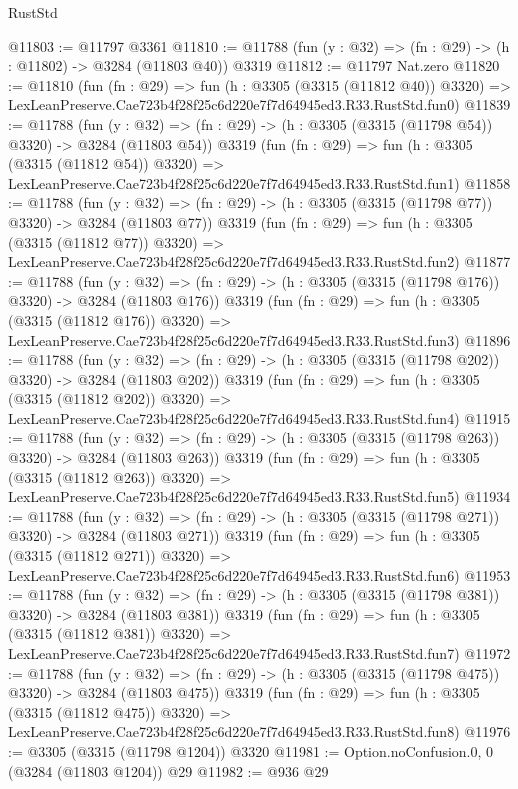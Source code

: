 \begin{lexlean}{RustStd}
\begin{coremodule}
@11803 := @11797 @3361
@11810 := @11788 (fun (y : @32) => (fn : @29) -> (h : @11802) -> @3284 (@11803 @40)) @3319
@11812 := @11797 Nat.zero
@11820 := @11810
    (fun (fn : @29) =>
    fun (h : @3305 (@3315 (@11812 @40)) @3320) =>
    LexLeanPreserve.Cae723b4f28f25c6d220e7f7d64945ed3.R33.RustStd.fun0)
@11839 := @11788
    (fun (y : @32) => (fn : @29) -> (h : @3305 (@3315 (@11798 @54)) @3320) -> @3284 (@11803 @54))
    @3319
    (fun (fn : @29) =>
    fun (h : @3305 (@3315 (@11812 @54)) @3320) =>
    LexLeanPreserve.Cae723b4f28f25c6d220e7f7d64945ed3.R33.RustStd.fun1)
@11858 := @11788
    (fun (y : @32) => (fn : @29) -> (h : @3305 (@3315 (@11798 @77)) @3320) -> @3284 (@11803 @77))
    @3319
    (fun (fn : @29) =>
    fun (h : @3305 (@3315 (@11812 @77)) @3320) =>
    LexLeanPreserve.Cae723b4f28f25c6d220e7f7d64945ed3.R33.RustStd.fun2)
@11877 := @11788
    (fun (y : @32) => (fn : @29) -> (h : @3305 (@3315 (@11798 @176)) @3320) -> @3284 (@11803 @176))
    @3319
    (fun (fn : @29) =>
    fun (h : @3305 (@3315 (@11812 @176)) @3320) =>
    LexLeanPreserve.Cae723b4f28f25c6d220e7f7d64945ed3.R33.RustStd.fun3)
@11896 := @11788
    (fun (y : @32) => (fn : @29) -> (h : @3305 (@3315 (@11798 @202)) @3320) -> @3284 (@11803 @202))
    @3319
    (fun (fn : @29) =>
    fun (h : @3305 (@3315 (@11812 @202)) @3320) =>
    LexLeanPreserve.Cae723b4f28f25c6d220e7f7d64945ed3.R33.RustStd.fun4)
@11915 := @11788
    (fun (y : @32) => (fn : @29) -> (h : @3305 (@3315 (@11798 @263)) @3320) -> @3284 (@11803 @263))
    @3319
    (fun (fn : @29) =>
    fun (h : @3305 (@3315 (@11812 @263)) @3320) =>
    LexLeanPreserve.Cae723b4f28f25c6d220e7f7d64945ed3.R33.RustStd.fun5)
@11934 := @11788
    (fun (y : @32) => (fn : @29) -> (h : @3305 (@3315 (@11798 @271)) @3320) -> @3284 (@11803 @271))
    @3319
    (fun (fn : @29) =>
    fun (h : @3305 (@3315 (@11812 @271)) @3320) =>
    LexLeanPreserve.Cae723b4f28f25c6d220e7f7d64945ed3.R33.RustStd.fun6)
@11953 := @11788
    (fun (y : @32) => (fn : @29) -> (h : @3305 (@3315 (@11798 @381)) @3320) -> @3284 (@11803 @381))
    @3319
    (fun (fn : @29) =>
    fun (h : @3305 (@3315 (@11812 @381)) @3320) =>
    LexLeanPreserve.Cae723b4f28f25c6d220e7f7d64945ed3.R33.RustStd.fun7)
@11972 := @11788
    (fun (y : @32) => (fn : @29) -> (h : @3305 (@3315 (@11798 @475)) @3320) -> @3284 (@11803 @475))
    @3319
    (fun (fn : @29) =>
    fun (h : @3305 (@3315 (@11812 @475)) @3320) =>
    LexLeanPreserve.Cae723b4f28f25c6d220e7f7d64945ed3.R33.RustStd.fun8)
@11976 := @3305 (@3315 (@11798 @1204)) @3320
@11981 := Option.noConfusion.{0, 0} (@3284 (@11803 @1204)) @29
@11982 := @936 @29

\end{coremodule}
\end{lexlean}
